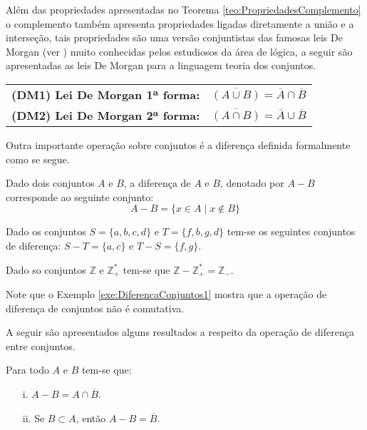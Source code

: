 Além das propriedades apresentadas no Teorema \ref{teo:PropriedadesComplemento} o complemento também apresenta propriedades ligadas diretamente a união e a interseção, tais propriedades são uma versão conjuntistas das famosas leis De Morgan (ver \cite{carmo2013, joaoPavao2014, lipschutz2013-MD}) muito conhecidas pelos estudiosos da área de lógica, a seguir são apresentadas as leis De Morgan para a linguagem teoria dos conjuntos.

\begin{table*}[h]
	\centering
	\begin{tabular}{lc}
		\textbf{(DM1) Lei De Morgan 1ª forma:} & $\overline{(A \cup B)} = \overline{A} \cap \overline{B}$\\
		\textbf{(DM2) Lei De Morgan 2ª forma:} & $\overline{(A \cap B)} = \overline{A} \cup \overline{B}$\\
	\end{tabular}
\end{table*}

Outra importante operação sobre conjuntos é a diferença definida formalmente como se segue.

\begin{definition}\label{def:DiferencaConjuntos}
	Dado dois conjuntos $A$ e $B$, a diferença de $A$ e $B$, denotado por $A - B$ corresponde ao seguinte conjunto:
	$$A - B = \{x \in A \mid x \notin B\}$$
\end{definition}

\begin{exem}\label{exe:DiferencaConjuntos1}
	Dado os conjuntos $S = \{a, b, c, d\}$ e $T = \{f, b, g, d\}$ tem-se os seguintes conjuntos de diferença: $S - T = \{a, c\}$ e $T - S = \{f, g\}$.
\end{exem}

\begin{exem}\label{exe:DiferencaConjuntos2}
	Dado so conjuntos $\mathbb{Z}$ e $\mathbb{Z}_+^*$ tem-se que $\mathbb{Z} - \mathbb{Z}_+^* = \mathbb{Z}_-$.
\end{exem}

\begin{rema}
	Note que o Exemplo \ref{exe:DiferencaConjuntos1} mostra que a operação de diferença de conjuntos não é comutativa.
\end{rema}

A seguir são apresentados alguns resultados a respeito da operação de diferença entre conjuntos.

\begin{theorem}\label{teo:BasicoDiferencaConjuntos}
	Para todo $A$ e $B$ tem-se que:
	\begin{itemize}
		\item[i.] $A - B = A \cap \overline{B}$.
		\item[ii.] Se $B \subset A$, então $A - B = \overline{B}$.
	\end{itemize}
\end{theorem}


